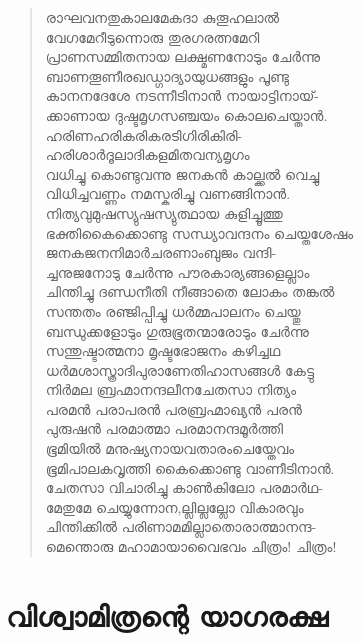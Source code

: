 \begin{verse}
രാഘവനതുകാലമേകദാ കുതൂഹലാല്‍\\
വേഗമേറീടുന്നൊരു തുരഗരത്നമേറി\\
പ്രാണസമ്മിതനായ ലക്ഷ്മണനോടും ചേര്‍ന്നു\\
ബാണതൂണീരഖഡ്ഗാദ്യായുധങ്ങളും പൂണ്ടു\\
കാനനദേശേ നടന്നീടിനാന്‍ നായാട്ടിനായ്-\\
ക്കാണായ ദുഷ്ടമൃഗസഞ്ചയം കൊലചെയ്താന്‍.\\
ഹരിണഹരികരികരടിഗിരികിരി-\\
ഹരിശാര്‍ദൂലാദികളമിതവന്യമൃഗം\\
വധിച്ചു കൊണ്ടുവന്നു ജനകന്‍ കാല്ക്കല്‍ വെച്ചു\\
വിധിച്ചവണ്ണം നമസ്കരിച്ചു വണങ്ങിനാന്‍.\\
നിത്യവുമുഷസ്യുഷസ്യുത്ഥായ കുളിച്ചൂത്തു\\
ഭക്തികൈക്കൊണ്ടു സന്ധ്യാവന്ദനം ചെയ്തശേഷം\\
ജനകജനനിമാര്‍ചരണാംബുജം വന്ദി-\\
ച്ചനുജനോടു ചേര്‍ന്നു പൗരകാര്യങ്ങളെല്ലാം\\
ചിന്തിച്ചു ദണ്ഡനീതി നീങ്ങാതെ ലോകം തങ്കല്‍\\
സന്തതം രഞ്ജിപ്പിച്ചു ധര്‍മ്മപാലനം ചെയ്തു\\
ബന്ധുക്കളോടും ഗുരുഭൂതന്മാരോടും ചേര്‍ന്നു\\
സന്തുഷ്ടാത്മനാ മൃഷ്ടഭോജനം കഴിച്ചഥ\\
ധര്‍മശാസ്ത്രാദിപുരാണേതിഹാസങ്ങള്‍ കേട്ടു\\
നിര്‍മല ബ്രഹ്മാനന്ദലീനചേതസാ നിത്യം\\
പരമന്‍ പരാപരന്‍ പരബ്രഹ്മാഖ്യന്‍ പരന്‍\\
പുരുഷന്‍ പരമാത്മാ പരമാനന്ദമൂര്‍ത്തി\\
ഭൂമിയില്‍ മനുഷ്യനായവതാരംചെയ്തേവം\\
ഭൂമിപാലകവൃത്തി കൈക്കൊണ്ടു വാണീടിനാന്‍.\\
ചേതസാ വിചാരിച്ചു കാണ്‍കിലോ പരമാര്‍ഥ-\\
മേതുമേ ചെയ്യുന്നോന,ല്ലില്ലല്ലോ വികാരവും\\
ചിന്തിക്കില്‍ പരിണാമമില്ലാതൊരാത്മാനന്ദ-\\
മെന്തൊരു മഹാമായാവൈഭവം ചിത്രം! ചിത്രം!
\end{verse}


\section{വിശ്വാമിത്രന്റെ യാഗരക്ഷ}

